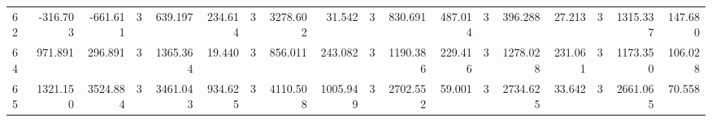 \begin{table}[ht]
\begin{tabular}{lrrrrrrrrrrrrrrrrr}
62 & -316.703 & -661.611 & 3 & 639.197 & 234.614 & 3 & 3278.602 & 31.542 & 3 & 830.691 & 487.014 & 3 & 396.288 & 27.213 & 3 & 1315.337 & 147.680 \\
64 & 971.891 & 296.891 & 3 & 1365.364 & 19.440 & 3 & 856.011 & 243.082 & 3 & 1190.386 & 229.416 & 3 & 1278.028 & 231.061 & 3 & 1173.350 & 106.028 \\
65 & 1321.150 & 3524.884 & 3 & 3461.043 & 934.625 & 3 & 4110.508 & 1005.949 & 3 & 2702.552 & 59.001 & 3 & 2734.625 & 33.642 & 3 & 2661.065 & 70.558 \\
\hline
\end{tabular}
\end{table}
